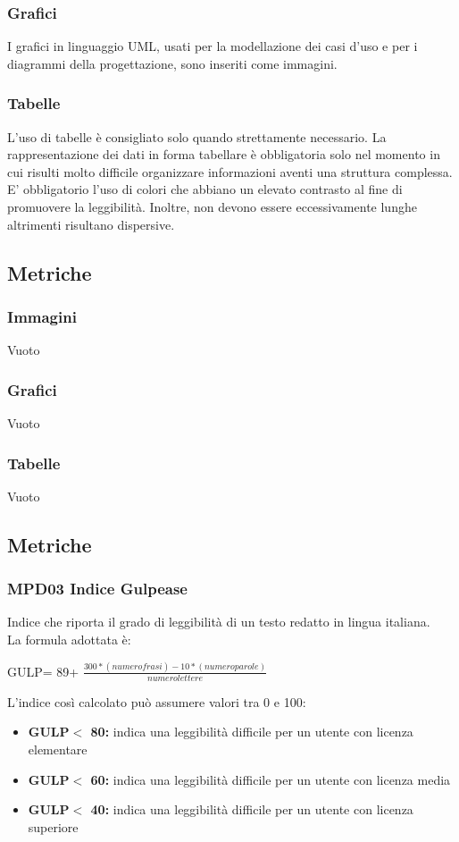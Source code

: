 \subsubsection{Grafici}
I grafici in linguaggio UML, usati per la modellazione dei casi d’uso e per i diagrammi della progettazione, sono inseriti come immagini.
\subsubsection{Tabelle}
L’uso di tabelle è consigliato solo quando strettamente necessario. La rappresentazione dei dati in forma tabellare è obbligatoria solo nel momento in cui risulti molto difficile organizzare informazioni aventi una struttura complessa.
E' obbligatorio l’uso di colori che abbiano un elevato contrasto al fine di promuovere la leggibilità. Inoltre, non devono essere eccessivamente lunghe altrimenti risultano dispersive.
\subsection{Metriche}
\subsubsection{Immagini}
{Vuoto}
\subsubsection{Grafici}
{Vuoto}
\subsubsection{Tabelle}
{Vuoto}
\subsection{Metriche}
\subsubsection{MPD03 Indice Gulpease}
Indice che riporta il grado di leggibilità di un testo redatto in lingua italiana. 
\\La formula adottata è:
\begin{center}
GULP= 89+ $\frac{300*(numero frasi)-10*(numero parole)}{numero lettere}$
\end{center}
L'indice così calcolato può assumere valori tra 0 e 100:
\begin{itemize}
\item \textbf{GULP$<$ 80:} indica una leggibilità difficile per un utente con licenza elementare
	\item \textbf{GULP$<$ 60:} indica una leggibilità difficile per un utente con licenza media
		\item \textbf{GULP$<$ 40:} indica una leggibilità difficile per un utente con licenza superiore
\end{itemize}

